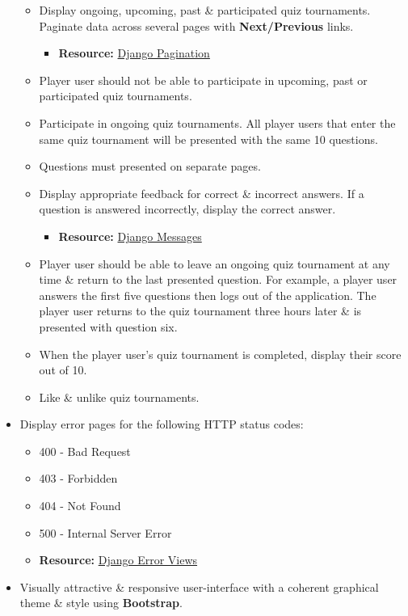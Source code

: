 \documentclass{article}
\begin{document}
\begin{itemize}
\begin{itemize}
		\item Display ongoing, upcoming, past \& participated quiz tournaments. Paginate data across several pages with \textbf{Next/Previous} links.
		\begin{itemize}
			\item \textbf{Resource:} \href{https://docs.djangoproject.com/en/3.1/topics/pagination/}{Django Pagination}
		\end{itemize}
		\item Player user should not be able to participate in upcoming, past or participated quiz tournaments.
		\item Participate in ongoing quiz tournaments. All player users that enter the same quiz tournament will be presented with the same 10 questions.
		\item Questions must presented on separate pages.
		\item Display appropriate feedback for correct \& incorrect answers. If a question is answered incorrectly, display the correct answer.
		\begin{itemize}
			\item \textbf{Resource:} \href{https://docs.djangoproject.com/en/3.1/ref/contrib/messages}{Django Messages}
		\end{itemize}
		\item Player user should be able to leave an ongoing quiz tournament at any time \& return to the last presented question. For example, a player user answers the first five questions then logs out of the application. The player user returns to the quiz tournament three hours later \& is presented with question six.
		\item When the player user's quiz tournament is completed, display their score out of 10.
		\item Like \& unlike quiz tournaments.
	\end{itemize}
	\item Display error pages for the following HTTP status codes:
	\begin{itemize}
		\item 400 - Bad Request
		\item 403 - Forbidden
		\item 404 - Not Found
		\item 500 - Internal Server Error
		\item \textbf{Resource:} \href{https://docs.djangoproject.com/en/3.1/ref/views/#error-views}{Django Error Views}
	\end{itemize}
	\item Visually attractive \& responsive user-interface with a coherent graphical theme \& style using \textbf{Bootstrap}.

\end{itemize}
\end{document}
